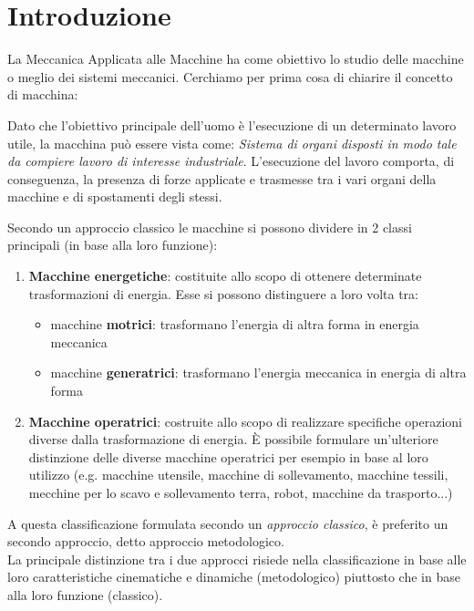 \chapter{Introduzione}

La Meccanica Applicata alle Macchine ha come obiettivo lo studio delle macchine o meglio dei sistemi meccanici.
Cerchiamo per prima cosa di chiarire il concetto di macchina:

Dato che l'obiettivo principale dell'uomo è l'esecuzione di un determinato lavoro utile, la macchina può essere vista come: \emph{Sistema di organi disposti in modo tale da compiere lavoro di interesse industriale}.
L'esecuzione del lavoro comporta, di conseguenza, la presenza di forze applicate e trasmesse tra i vari organi della macchine e di spostamenti degli stessi.

Secondo un approccio classico le macchine si possono dividere in 2 classi principali (in base alla loro funzione):
    \begin{enumerate}
        \item \textbf{Macchine energetiche}:
            costituite allo scopo di ottenere determinate trasformazioni di energia.
            Esse si possono distinguere a loro volta tra:
            
            \begin{itemize}
                \item macchine \textbf{motrici}: trasformano l'energia di altra forma in energia meccanica
                \item macchine \textbf{generatrici}: trasformano l'energia meccanica in energia di altra forma
            \end{itemize}
        \item \textbf{Macchine operatrici}:
            costruite allo scopo di realizzare specifiche operazioni diverse dalla trasformazione di energia.
             È possibile formulare un'ulteriore distinzione delle diverse macchine operatrici per esempio in base
             al loro utilizzo (e.g. macchine utensile, macchine di sollevamento, macchine tessili, mecchine per lo scavo e sollevamento terra, robot, macchine da trasporto...)
    \end{enumerate}

A questa classificazione formulata secondo un \emph{approccio classico}, è preferito un secondo approccio, detto approccio metodologico.\\
La principale distinzione tra i due approcci risiede nella classificazione in base alle loro caratteristiche cinematiche e dinamiche (metodologico)
piuttosto che in base alla loro funzione (classico).

